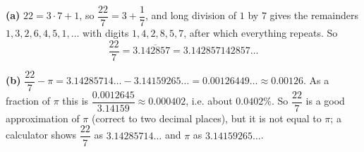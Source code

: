 \textbf{(a)} $22=3\cdot7+1$, so $\dfrac{22}7=3+\dfrac17$, and long division of $1$ by $7$ gives the remainders $1,3,2,6,4,5,1,\dots$ with digits $1,4,2,8,5,7$, after which everything repeats. So
\[\dfrac{22}{7}=\boxed{3.\overline{142857}}=3.142857142857\ldots\]

\textbf{(b)} $\dfrac{22}7-\pi=3.14285714\ldots-3.14159265\ldots=0.00126449\ldots\approx\boxed{0.00126}$. As a fraction of $\pi$ this is $\dfrac{0.0012645}{3.14159}\approx0.000402$, i.e. about $\boxed{0.0402\%}$. So $\dfrac{22}{7}$ is a good approximation of $\pi$ (correct to two decimal places), but it is not equal to $\pi$; a calculator shows $\dfrac{22}{7}$ as $3.14285714\ldots$ and $\pi$ as $3.14159265\ldots$.
